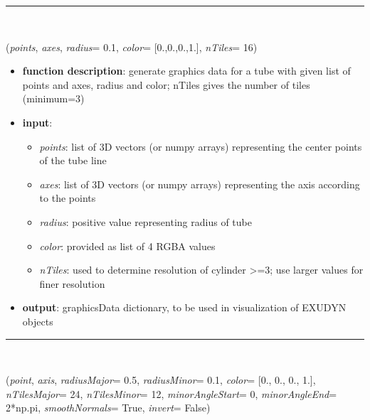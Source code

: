 \begin{itemize}[leftmargin=1.4cm]
\begin{itemize}[leftmargin=1.4cm]
\begin{itemize}[leftmargin=1.4cm]
\begin{itemize}[leftmargin=0.5cm]
\begin{itemize}[leftmargin=1.4cm]
\begin{itemize}[leftmargin=1.4cm]
\begin{itemize}[leftmargin=1.4cm]
\begin{itemize}[leftmargin=0.5cm]
\begin{itemize}[leftmargin=1.4cm]
%
\noindent\rule{8cm}{0.75pt}\vspace{1pt} \\ 
\begin{flushleft}
\label{sec:graphics:Tube}
({\it points}, {\it axes}, {\it radius}= 0.1, {\it color}= [0.,0.,0.,1.], {\it nTiles}= 16)
\end{flushleft}
\setlength{\itemindent}{0.7cm}
\begin{itemize}[leftmargin=0.7cm]
\item[--]
{\bf function description}: generate graphics data for a tube with given list of points and axes, radius and color; nTiles gives the number of tiles (minimum=3)
\item[--]
{\bf input}: \vspace{-6pt}
\begin{itemize}[leftmargin=1.2cm]
\setlength{\itemindent}{-0.7cm}
\item[]{\it points}: list of 3D vectors (or numpy arrays) representing the center points of the tube line
\item[]{\it axes}: list of 3D vectors (or numpy arrays) representing the axis according to the points
\item[]{\it radius}: positive value representing radius of tube
\item[]{\it color}: provided as list of 4 RGBA values
\item[]{\it nTiles}: used to determine resolution of cylinder >=3; use larger values for finer resolution
\end{itemize}
\item[--]
{\bf output}: graphicsData dictionary, to be used in visualization of EXUDYN objects
\vspace{12pt}\end{itemize}
%
\noindent\rule{8cm}{0.75pt}\vspace{1pt} \\ 
\begin{flushleft}
\label{sec:graphics:Torus}
({\it point}, {\it axis}, {\it radiusMajor}= 0.5, {\it radiusMinor}= 0.1, {\it color}= [0., 0., 0., 1.], {\it nTilesMajor}= 24, {\it nTilesMinor}= 12, {\it minorAngleStart}= 0, {\it minorAngleEnd}= 2*np.pi, {\it smoothNormals}= True, {\it invert}= False)
\end{flushleft}
\setlength{\itemindent}{0.7cm}

\end{itemize}
\end{itemize}
\end{itemize}
\end{itemize}
\end{itemize}
\end{itemize}
\end{itemize}
\end{itemize}
\end{itemize}
